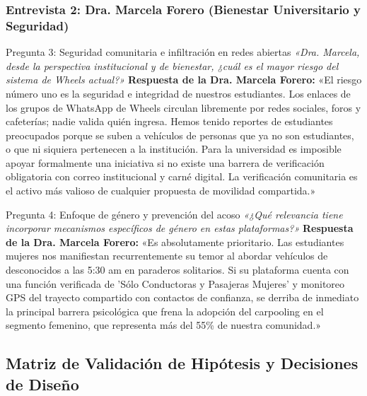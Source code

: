 \documentclass[11pt,a4paper]{article}
\begin{document}
\subsubsection{Entrevista 2: Dra. Marcela Forero (Bienestar Universitario y Seguridad)}

\begin{evidencebox}{Pregunta 3: Seguridad comunitaria e infiltración en redes abiertas}
\textit{«Dra. Marcela, desde la perspectiva institucional y de bienestar, ¿cuál es el mayor riesgo del sistema de Wheels actual?»}
\tcblower
\textbf{Respuesta de la Dra. Marcela Forero:}  
«El riesgo número uno es la seguridad e integridad de nuestros estudiantes. Los enlaces de los grupos de WhatsApp de Wheels circulan libremente por redes sociales, foros y cafeterías; nadie valida quién ingresa. Hemos tenido reportes de estudiantes preocupados porque se suben a vehículos de personas que ya no son estudiantes, o que ni siquiera pertenecen a la institución. Para la universidad es imposible apoyar formalmente una iniciativa si no existe una barrera de verificación obligatoria con correo institucional y carné digital. La verificación comunitaria es el activo más valioso de cualquier propuesta de movilidad compartida.»
\end{evidencebox}

\begin{evidencebox}{Pregunta 4: Enfoque de género y prevención del acoso}
\textit{«¿Qué relevancia tiene incorporar mecanismos específicos de género en estas plataformas?»}
\tcblower
\textbf{Respuesta de la Dra. Marcela Forero:}  
«Es absolutamente prioritario. Las estudiantes mujeres nos manifiestan recurrentemente su temor al abordar vehículos de desconocidos a las 5:30 am en paraderos solitarios. Si su plataforma cuenta con una función verificada de 'Sólo Conductoras y Pasajeras Mujeres' y monitoreo GPS del trayecto compartido con contactos de confianza, se derriba de inmediato la principal barrera psicológica que frena la adopción del carpooling en el segmento femenino, que representa más del 55\% de nuestra comunidad.»
\end{evidencebox}

\subsection{Matriz de Validación de Hipótesis y Decisiones de Diseño}
\end{document}
